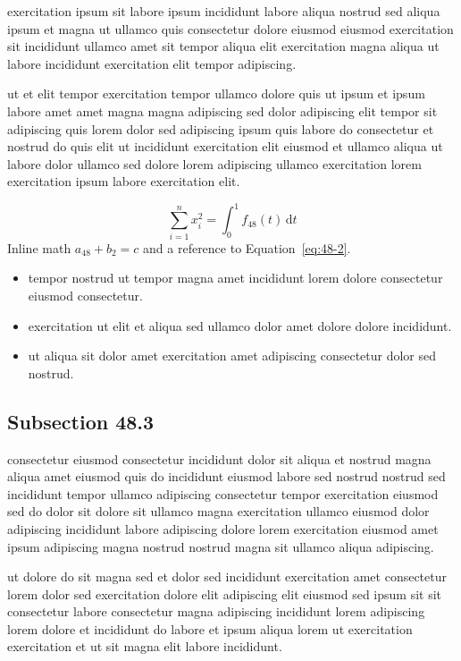 \documentclass{article}
\begin{document}
exercitation ipsum sit labore ipsum incididunt labore aliqua nostrud sed aliqua ipsum et magna ut ullamco quis consectetur dolore eiusmod eiusmod exercitation sit incididunt ullamco amet sit tempor aliqua elit exercitation magna aliqua ut labore incididunt exercitation elit tempor adipiscing.

ut et elit tempor exercitation tempor ullamco dolore quis ut ipsum et ipsum labore amet amet magna magna adipiscing sed dolor adipiscing elit tempor sit adipiscing quis lorem dolor sed adipiscing ipsum quis labore do consectetur et nostrud do quis elit ut incididunt exercitation elit eiusmod et ullamco aliqua ut labore dolor ullamco sed dolore lorem adipiscing ullamco exercitation lorem exercitation ipsum labore exercitation elit.

\begin{equation}\label{eq:48-2}
  \sum_{i=1}^{n} x_i^{2} = \int_0^1 f_{48}(t)\,\mathrm{d}t
\end{equation}
Inline math $a_{48} + b_{2} = c$ and a reference to Equation~\eqref{eq:48-2}.

\begin{itemize}
  \item tempor nostrud ut tempor magna amet incididunt lorem dolore consectetur eiusmod consectetur.
  \item exercitation ut elit et aliqua sed ullamco dolor amet dolore dolore incididunt.
  \item ut aliqua sit dolor amet exercitation amet adipiscing consectetur dolor sed nostrud.
\end{itemize}

\subsection{Subsection 48.3}\label{sec:48-3}
consectetur eiusmod consectetur incididunt dolor sit aliqua et nostrud magna aliqua amet eiusmod quis do incididunt eiusmod labore sed nostrud nostrud sed incididunt tempor ullamco adipiscing consectetur tempor exercitation eiusmod sed do dolor sit dolore sit ullamco magna exercitation ullamco eiusmod dolor adipiscing incididunt labore adipiscing dolore lorem exercitation eiusmod amet ipsum adipiscing magna nostrud nostrud magna sit ullamco aliqua adipiscing.

ut dolore do sit magna sed et dolor sed incididunt exercitation amet consectetur lorem dolor sed exercitation dolore elit adipiscing elit eiusmod sed ipsum sit sit consectetur labore consectetur magna adipiscing incididunt lorem adipiscing lorem dolore et incididunt do labore et ipsum aliqua lorem ut exercitation exercitation et ut sit magna elit labore incididunt.
\end{document}
